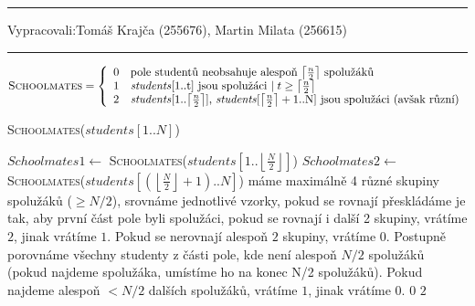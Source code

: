 \documentclass[12pt]{article}
\newcommand{\move}{\rightarrow}
\newcommand{\var}[1]{\textit{#1}}
\newcommand{\zadani}[2]{
{\large
\noindent {\bf IB108 \hfill{} Sada #1, Příklad #2 \\[-4mm]}
\noindent\hrule
\vspace{2mm}
\noindent Vypracovali:\hfill{}Tomáš Krajča (255676), Martin Milata (256615)
\vspace{3mm}
\hrule
\bigskip\bigskip}
}
\begin{document}
\zadani{2}{1}

\noindent
\begin{equation*}
\textsc{Schoolmates} = \left\{
	\begin{array}{rl}
	0 & \text{pole studentů neobsahuje alespoň $\left\lceil \frac{n}{2}
	\right\rceil$ spolužáků}\\
	1 & \text{\var{students}[1..t] jsou spolužáci $\mid t \geq \left\lceil \frac{n}{2}
	\right\rceil$}\\
	2 & \text{\var{students}[1..$\left\lceil \frac{n}{2}
	\right\rceil$], \var{students}[$\left\lceil \frac{n}{2}
	\right\rceil+1$..N] jsou
	spolužáci (avšak různí)}\\
	\end{array} \right.
\end{equation*}

\begin{algorithm}
\textsc{Schoolmates}($students[1..N]$)
\begin{algorithmic}
\STATE $Schoolmates1 \gets$ \textsc{Schoolmates}($students[1..\left\lfloor \frac{N}{2}
\right\rfloor]$)
\STATE $Schoolmates2 \gets$ \textsc{Schoolmates}($students[(\left\lfloor \frac{N}{2} \right\rfloor+1)..N]$)
\STATE máme maximálně 4 různé skupiny spolužáků ($\geq N/2$), srovnáme
jednotlivé vzorky, pokud se rovnají přeskládáme je tak, aby první část pole byli
spolužáci, pokud se rovnají i další 2 skupiny, vrátíme $2$, jinak vrátíme $1$.
Pokud se nerovnají alespoň $2$ skupiny, vrátíme $0$.
\STATE Postupně porovnáme všechny studenty z části pole, kde není alespoň $N/2$
spolužáků (pokud najdeme spolužáka, umístíme ho na konec N/2 spolužáků). Pokud
najdeme alespoň $<N/2$ dalších spolužáků, vrátíme $1$, jinak vrátíme $0$.
\RETURN $0$
\ENDIF
\ELSE
\RETURN $2$
\ENDIF
\end{algorithmic}
\end{algorithm}
\end{document}
